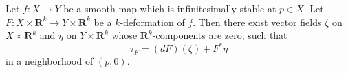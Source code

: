 Let $f \colon X \to Y$ be a smooth map which is infinitesimally stable at $p \in X$.
Let $F \colon X \times \mathbf{R}^k \to Y \times \mathbf{R}^k$ be a $k$-deformation of $f$.
Then there exist vector fields $\zeta$ on $X \times \mathbf{R}^k$ and $\eta$ on $Y \times \mathbf{R}^k$
whose $\mathbf{R}^k$-components are zero, such that
$$\tau_F = (dF)(\zeta) + F^*\eta$$
in a neighborhood of $(p, 0)$.
